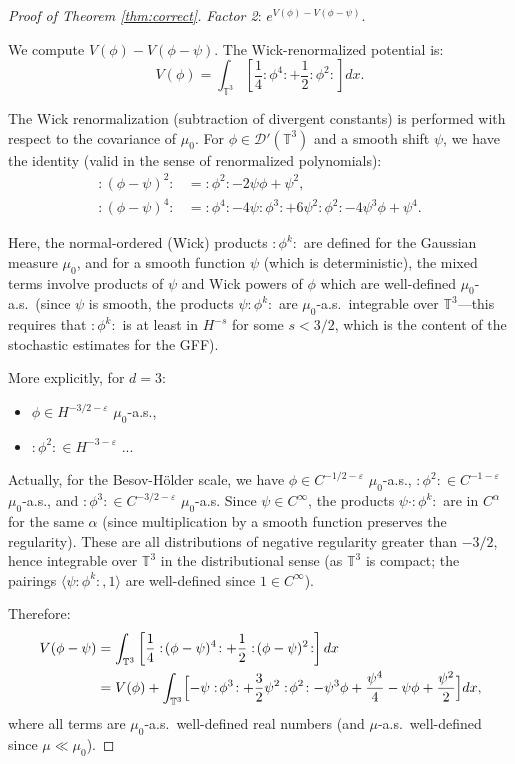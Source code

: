 \documentclass[12pt]{article}
\theoremstyle{definition}
\begin{document}
\begin{proof}[Proof of Theorem \ref{thm:correct}]
\textit{Factor 2}: $e^{V(\phi) - V(\phi-\psi)}$.

We compute $V(\phi) - V(\phi-\psi)$. The Wick-renormalized potential is:
$$V(\phi) = \int_{\mathbb{T}^3}\left[\frac{1}{4}:\!\phi^4\!: + \frac{1}{2}:\!\phi^2\!:\right]dx.$$

The Wick renormalization (subtraction of divergent constants) is performed with respect to the covariance of $\mu_0$. For $\phi \in \mathcal{D}'(\mathbb{T}^3)$ and a smooth shift $\psi$, we have the identity (valid in the sense of renormalized polynomials):
\begin{align*}
:\!(\phi-\psi)^2\!: &= :\!\phi^2\!: - 2\psi\phi + \psi^2, \\
:\!(\phi-\psi)^4\!: &= :\!\phi^4\!: - 4\psi:\!\phi^3\!: + 6\psi^2:\!\phi^2\!: - 4\psi^3\phi + \psi^4.
\end{align*}

Here, the normal-ordered (Wick) products $:\!\phi^k\!:$ are defined for the Gaussian measure $\mu_0$, and for a smooth function $\psi$ (which is deterministic), the mixed terms involve products of $\psi$ and Wick powers of $\phi$ which are well-defined $\mu_0$-a.s.\ (since $\psi$ is smooth, the products $\psi :\!\phi^k\!:$ are $\mu_0$-a.s.\ integrable over $\mathbb{T}^3$—this requires that $:\!\phi^k\!:$ is at least in $H^{-s}$ for some $s < 3/2$, which is the content of the stochastic estimates for the GFF).

More explicitly, for $d=3$:
\begin{itemize}
\item $\phi \in H^{-3/2-\varepsilon}$ $\mu_0$-a.s.,
\item $:\!\phi^2\!: \in H^{-3-\varepsilon}$ ...
\end{itemize}

Actually, for the Besov-H\"older scale, we have $\phi \in C^{-1/2-\varepsilon}$ $\mu_0$-a.s., $:\!\phi^2\!: \in C^{-1-\varepsilon}$ $\mu_0$-a.s., and $:\!\phi^3\!: \in C^{-3/2-\varepsilon}$ $\mu_0$-a.s. Since $\psi \in C^\infty$, the products $\psi \cdot :\!\phi^k\!:$ are in $C^{\alpha}$ for the same $\alpha$ (since multiplication by a smooth function preserves the regularity). These are all distributions of negative regularity greater than $-3/2$, hence integrable over $\mathbb{T}^3$ in the distributional sense (as $\mathbb{T}^3$ is compact; the pairings $\langle \psi:\!\phi^k\!:, 1\rangle$ are well-defined since $1 \in C^\infty$).

Therefore:
\begin{align*}
V(\phi-\psi) &= \int_{\mathbb{T}^3}\left[\frac{1}{4}:\!(\phi-\psi)^4\!: + \frac{1}{2}:\!(\phi-\psi)^2\!:\right]dx \\
&= V(\phi) + \int_{\mathbb{T}^3}\Bigl[-\psi:\!\phi^3\!: + \frac{3}{2}\psi^2:\!\phi^2\!: - \psi^3\phi + \frac{\psi^4}{4} - \psi\phi + \frac{\psi^2}{2}\Bigr]dx,
\end{align*}
where all terms are $\mu_0$-a.s.\ well-defined real numbers (and $\mu$-a.s.\ well-defined since $\mu \ll \mu_0$).


\end{proof}
\end{document}
